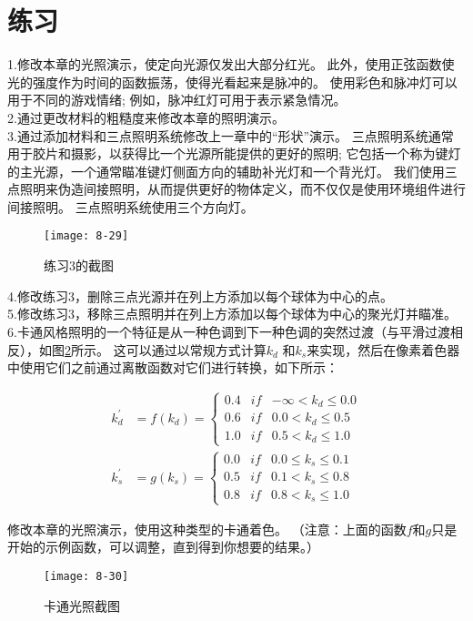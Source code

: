 \section{练习}
\begin{flushleft}
1.修改本章的光照演示，使定向光源仅发出大部分红光。 此外，使用正弦函数使光的强度作为时间的函数振荡，使得光看起来是脉冲的。 使用彩色和脉冲灯可以用于不同的游戏情绪; 例如，脉冲红灯可用于表示紧急情况。\\

2.通过更改材料的粗糙度来修改本章的照明演示。\\
3.通过添加材料和三点照明系统修改上一章中的“形状”演示。 三点照明系统通常用于胶片和摄影，以获得比一个光源所能提供的更好的照明; 它包括一个称为键灯的主光源，一个通常瞄准键灯侧面方向的辅助补光灯和一个背光灯。 我们使用三点照明来伪造间接照明，从而提供更好的物体定义，而不仅仅是使用环境组件进行间接照明。 三点照明系统使用三个方向灯。\\
\end{flushleft}

\begin{figure}[h]
    \texttt{[image: 8-29]}
    \centering
    \caption{练习3的截图}
    \label{fig:8-29}
\end{figure}

\begin{flushleft}
4.修改练习3，删除三点光源并在列上方添加以每个球体为中心的点。\\
5.修改练习3，移除三点照明并在列上方添加以每个球体为中心的聚光灯并瞄准。\\
6.卡通风格照明的一个特征是从一种色调到下一种色调的突然过渡（与平滑过渡相反），如图\ref{fig:8-30}所示。 这可以通过以常规方式计算$k_{d}$ 和$k_{s}$来实现，然后在像素着色器中使用它们之前通过离散函数对它们进行转换，如下所示：\\
\end{flushleft}

\begin{align*}
k^{'}_{d}&=f(k_{d})=\left\{\begin{matrix}
0.4 & if & -\infty < k_{d} \leq 0.0 \\ 
0.6 & if & 0.0 < k_{d} \leq 0.5 \\
1.0 & if & 0.5 < k_{d} \leq 1.0 
\end{matrix}\right. \\
k^{'}_{s}&=g(k_{s})=\left\{\begin{matrix}
0.0 & if & 0.0 \leq k_{s} \leq 0.1 \\ 
0.5 & if & 0.1 < k_{s} \leq 0.8 \\
0.8 & if & 0.8 < k_{s} \leq 1.0 
\end{matrix}\right.
\end{align*}

\begin{flushleft}
修改本章的光照演示，使用这种类型的卡通着色。 （注意：上面的函数$f$和$g$只是开始的示例函数，可以调整，直到得到你想要的结果。）
\end{flushleft}

\begin{figure}[h]
    \texttt{[image: 8-30]}
    \centering
    \caption{卡通光照截图}
    \label{fig:8-30}
\end{figure}


